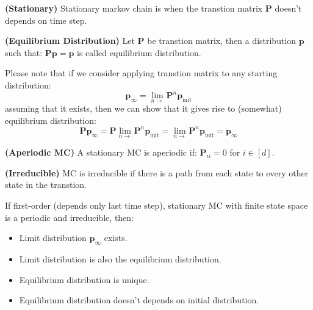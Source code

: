 \begin{definition}{\textbf{(Stationary)}}
    Stationary markov chain is when the transtion matrix $\boldsymbol P$ doesn't depends on time step. 
\end{definition}

\begin{definition}{\textbf{(Equilibrium Distribution)}}
    Let $\boldsymbol P$ be transtion matrix, then a distribution $\boldsymbol p$ such that: $\boldsymbol P\boldsymbol p = \boldsymbol p$ is called equilibrium distribution. 
\end{definition}

\begin{remark}
    Please note that if we consider applying transtion matrix to any starting distribution:
    \begin{equation*}
        \boldsymbol p_\infty = \lim_{n\rightarrow} \boldsymbol P^n\boldsymbol p_\text{init}
    \end{equation*}
    assuming that it exists, then we can show that it gives rise to (somewhat) equilibrium distribution:
    \begin{equation*} 
        \boldsymbol P \boldsymbol p_\infty = \boldsymbol P \lim_{n\rightarrow} \boldsymbol P^n\boldsymbol p_\text{init} = \lim_{n\rightarrow} \boldsymbol P^n\boldsymbol p_\text{init} = \boldsymbol p_\infty 
    \end{equation*}
\end{remark}

\begin{definition}{\textbf{(Aperiodic MC)}}
    A stationary MC is aperiodic if: $\boldsymbol P_{ii} = 0$ for $i \in [d]$.
\end{definition}

\begin{definition}{\textbf{(Irreducible)}}
    MC is irreducible if there is a path from each state to every other state in the transtion.
\end{definition}

\begin{theorem}
    If first-order (depends only last time step), stationary MC with finite state space is a periodic and irreducible, then:
    \begin{itemize}
        \item Limit distribution $\boldsymbol p_\infty$ exists.
        \item Limit distribution is also the equilibrium distribution.
        \item Equilibrium distribution is unique. 
        \item Equilibrium distribution doesn't depends on initial distribution.
    \end{itemize}
\end{theorem}

